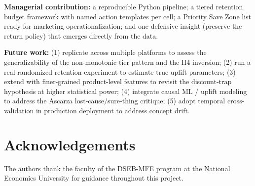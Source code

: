 \documentclass[conference]{IEEEtran}
\begin{document}
\textbf{Managerial contribution:} a reproducible Python pipeline; a tiered retention budget framework with named action templates per cell; a Priority Save Zone list ready for marketing operationalization; and one defensive insight (preserve the return policy) that emerges directly from the data.

\textbf{Future work:} (1) replicate across multiple platforms to assess the generalizability of the non-monotonic tier pattern and the H4 inversion; (2) run a real randomized retention experiment to estimate true uplift parameters; (3) extend with finer-grained product-level features to revisit the discount-trap hypothesis at higher statistical power; (4) integrate causal ML / uplift modeling to address the Ascarza lost-cause/sure-thing critique; (5) adopt temporal cross-validation in production deployment to address concept drift.

\section*{Acknowledgements}
The authors thank the faculty of the DSEB-MFE program at the National Economics University for guidance throughout this project.
\end{document}
